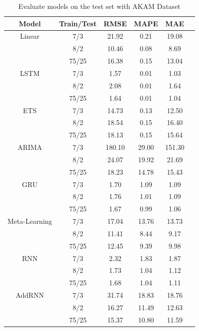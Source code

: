 \documentclass{ieeeojies}
\begin{document}
\vspace{-10pt}
\begin{table}[H]
\centering
\begin{tabular}{cccccc}
\toprule
\textbf{Model} & \textbf{Train/Test} & \textbf{RMSE} & \textbf{MAPE} & \textbf{MAE} \\ 
\midrule
Linear & 7/3 & 21.92 & 0.21 & 19.08 \\ 
       & 8/2 & 10.46 & 0.08 & 8.69 \\ 
       & 75/25 & 16.38 & 0.15 & 13.04 \\ 
\midrule
LSTM   & 7/3 & 1.57 & 0.01 & 1.03 \\ 
       & 8/2 & 2.08 & 0.01 & 1.64 \\ 
       & 75/25 & 1.64 & 0.01 & 1.04 \\ 
\midrule
ETS    & 7/3 & 14.73 & 0.13 & 12.50 \\ 
       & 8/2 & 18.54 & 0.15 & 16.40 \\ 
       & 75/25 & 18.13 & 0.15 & 15.64 \\ 
\midrule
ARIMA  & 7/3 & 180.10 & 29.00 & 151.30 \\ 
       & 8/2 & 24.07 & 19.92 & 21.69 \\ 
       & 75/25 & 18.23 & 14.78 & 15.43 \\ 
\midrule
GRU    & 7/3 & 1.70 & 1.09 & 1.09 \\ 
       & 8/2 & 1.76 & 1.01 & 1.09 \\ 
       & 75/25 & 1.67 & 0.99 & 1.06 \\ 
\midrule
Meta-Learning & 7/3 & 17.04 & 13.76 & 13.73 \\ 
              & 8/2 & 11.41 & 8.44 & 9.17 \\ 
              & 75/25 & 12.45 & 9.39 & 9.98 \\ 
\midrule
RNN    & 7/3 & 2.32 & 1.83 & 1.87 \\ 
       & 8/2 & 1.73 & 1.04 & 1.12 \\ 
       & 75/25 & 1.68 & 1.04 & 1.11 \\ 
\midrule
AddRNN & 7/3 & 31.74 & 18.83 & 18.76 \\ 
       & 8/2 & 16.27 & 11.49 & 12.63 \\ 
       & 75/25 & 15.37 & 10.80 & 11.59 \\ 
\bottomrule
\end{tabular}
\caption{Evaluate models on the test set with AKAM Dataset}
\label{table:performance_metrics_akam}
\end{table}
\vspace{-10pt}
\end{document}
